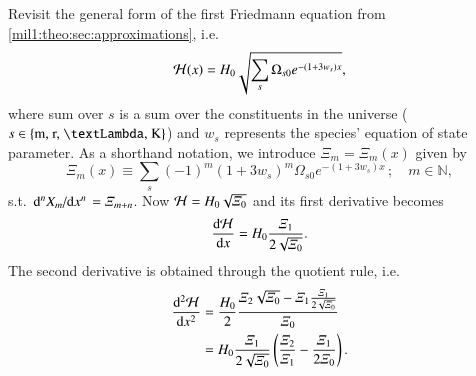 




Revisit the general form of the first Friedmann equation from \cref{mil1:theo:sec:approximations}, i.e.
\begin{equation}\label{app:hubble_derivatives:eq:Hp_of_x}
    \mathcal{H}(x) = H_0 \sqrt{\sum_{s}\Omega_{s0}e^{-(1+3w_s)x}},
\end{equation}
where sum over $s$ is a sum over the constituents in the universe ($s\in\left\{\text{m, r, \textLambda, K} \right\}$) and $w_s$ represents the species' equation of state parameter. As a shorthand notation, we introduce $\varXi_m = \varXi_m(x)$ given by
\begin{equation}\label{app:hubble_derivatives:eq:Xi_of_x}
    \varXi_{m}(x)\equiv \sum_{s} (-1)^m(1+3w_s)^m \Omega_{s0}e^{-(1+3w_s)x} \,; \quad m\in\mathbb{N},
\end{equation}\label{app:hubble_derivatives:dHp_dx}
s.t. $\dv*[n]{X_m}{x} = \varXi_{m+n}$. Now $\mathcal{H} = H_0\sqrt{\varXi_0}$ and its first derivative becomes
\begin{equation}
    \dv{\mathcal{H}}{x} = H_0 \frac{\varXi_1}{2\sqrt{\varXi_0}}.
\end{equation}
The second derivative is obtained through the quotient rule, i.e.
\begin{equation}\label{app:hubble_derivatives:eq:ddHp_dxx}
    \begin{split}
    \dv[2]{\mathcal{H}}{x} &= \frac{H_0}{2} \frac{\varXi_2\sqrt{\varXi_0} - \varXi_1\frac{\varXi_1}{2\sqrt{\varXi_0}}}{\varXi_0} \\
    &= H_0\frac{\varXi_1} {2\sqrt{\varXi_0}}\left(  \frac{\varXi_2}{\varXi_1}- \frac{\varXi_1}{2\varXi_0} \right).
    \end{split}
\end{equation}


